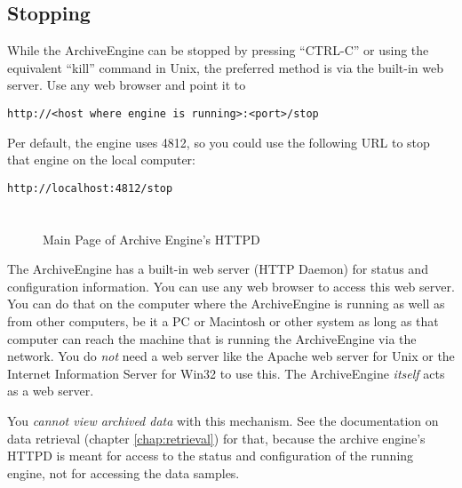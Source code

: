 \subsection{Stopping}
While the ArchiveEngine can be stopped by pressing ``CTRL-C''
or using the equivalent ``kill'' command in Unix, the preferred method is
via the built-in web server. Use any web browser and point it to

\begin{lstlisting}[frame=none,keywordstyle=\sffamily]
    http://<host where engine is running>:<port>/stop
\end{lstlisting}

\noindent Per default, the engine uses 4812, so you could use the
following URL to stop that engine on the local computer:

\begin{lstlisting}[frame=none,keywordstyle=\sffamily]
    http://localhost:4812/stop
\end{lstlisting}

\section{} \label{sec:enginehttp} %
\begin{figure}[htb]
\begin{center}
\end{center}
\caption{\label{fig:engine:main}Main Page of Archive Engine's HTTPD}
\end{figure}

The ArchiveEngine has a built-in web server (HTTP Daemon) for status
and configuration information.  You can use any web browser to access
this web server.  You can do that on the computer where the
ArchiveEngine is running as well as from other computers, be it a PC
or Macintosh or other system as long as that computer can reach the
machine that is running the ArchiveEngine via the network.  You do
\emph{not} need a web server like the Apache web server for Unix or
the Internet Information Server for Win32 to use this. The
ArchiveEngine \emph{itself} acts as a web server.

You \emph{cannot view archived data} with this mechanism.  See the
documentation on data retrieval (chapter \ref{chap:retrieval}) for
that, because the archive engine's HTTPD is meant for access to the
status and configuration of the running engine, not for accessing the
data samples.

